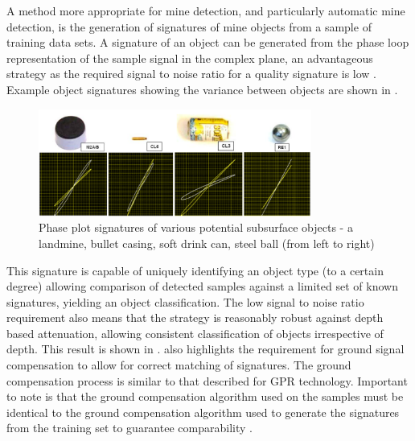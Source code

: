 \documentclass[main.tex]{subfiles}
\begin{document}
A method more appropriate for mine detection, and particularly automatic mine detection, is the generation of signatures of mine objects from a sample of training data sets. A signature of an object can be generated from the phase loop representation of the sample signal in the complex plane, an advantageous strategy as the required signal to noise ratio for a quality signature is low \parencite{Kruger2006}. Example object signatures showing the variance between objects are shown in .
\begin{figure}[ht]
\includegraphics[width=0.8\textwidth]{3-LiteratureReview/signature.png}
\centering
\caption[Phase plot signatures of various potential subsurface objects - a landmine, bullet casing, soft drink can, steel ball (from left to right)]{Phase plot signatures of various potential subsurface objects - a landmine, bullet casing, soft drink can, steel ball (from left to right) \parencite{Kruger2006}} 
\end{figure}
This signature is capable of uniquely identifying an object type (to a certain degree) allowing comparison of detected samples against a limited set of known signatures, yielding an object classification. The low signal to noise ratio requirement also means that the strategy is reasonably robust against depth based attenuation, allowing consistent classification of objects irrespective of depth. This result is shown in .  also highlights the requirement for ground signal compensation to allow for correct matching of signatures. The ground compensation process is similar to that described for GPR technology. Important to note is that the ground compensation algorithm used on the samples must be identical to the ground compensation algorithm used to generate the signatures from the training set to guarantee comparability \parencite{Kruger2006}.
\end{document}
